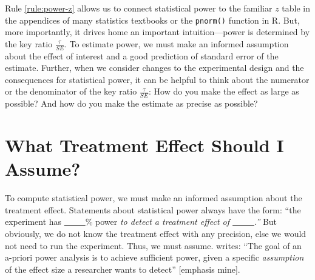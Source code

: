 \documentclass[12pt]{article}
\begin{document}
\noindent Rule \ref{rule:power-z} allows us to connect statistical power to the familiar $z$ table in the appendices of many statistics textbooks or the \texttt{pnorm()} function in R.
But, more importantly, it drives home an important intuition---power is determined by the key ratio $\frac{\tau}{SE}$. 
To estimate power, we must make an informed assumption about the effect of interest and a good prediction of standard error of the estimate. 
Further, when we consider changes to the experimental design and the consequences for statistical power, it can be helpful to think about the numerator or the denominator of the key ratio $\frac{\tau}{SE}$: How do you make the effect as large as
possible? And how do you make the estimate as precise as possible?

\section*{What Treatment Effect Should I Assume?}

To compute statistical power, we must make an informed assumption about the treatment effect. 
Statements about statistical power always have the form: ``the experiment has \underline{~~~~~}\% power \emph{to detect a treatment effect of \underline{~~~~~}.''} 
But obviously, we do not know the treatment effect with any precision, else we would not need to run the experiment. Thus, we must assume. 
\citet[6]{Lakens2022}  writes: ``The goal of an a-priori power analysis is to achieve sufficient power, given a specific \emph{assumption} of the effect size a researcher wants to detect'' [emphasis mine].
\end{document}
